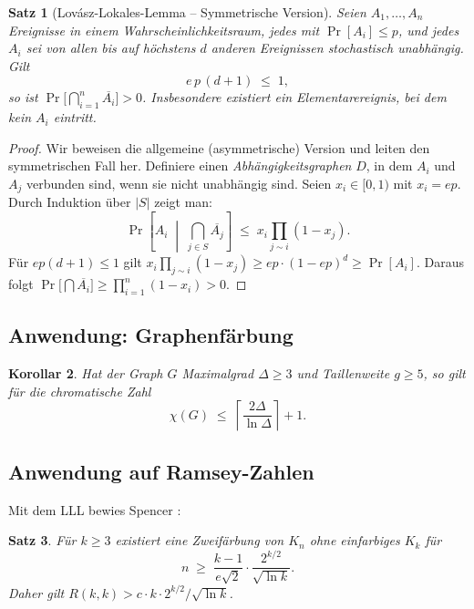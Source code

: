 \documentclass[12pt,a4paper]{amsart}
\newtheorem{theorem}{Satz}[section]
\newtheorem{corollary}[theorem]{Korollar}
\theoremstyle{definition}
\theoremstyle{remark}
\begin{document}
\begin{theorem}[Lov\'asz-Lokales-Lemma -- Symmetrische Version]\label{satz:lll}
Seien $A_1, \ldots, A_n$ Ereignisse in einem Wahrscheinlichkeitsraum, jedes mit
$\Pr[A_i] \le p$, und jedes $A_i$ sei von allen bis auf h\"ochstens $d$ anderen
Ereignissen stochastisch unabh\"angig.  Gilt
\[
  e\,p\,(d+1) \;\le\; 1,
\]
so ist $\Pr\bigl[\bigcap_{i=1}^n \overline{A_i}\bigr] > 0$.  Insbesondere
existiert ein Elementarereignis, bei dem kein $A_i$ eintritt.
\end{theorem}

\begin{proof}
Wir beweisen die allgemeine (asymmetrische) Version und leiten den symmetrischen
Fall her.  Definiere einen \emph{Abh\"angigkeitsgraphen} $D$, in dem $A_i$ und
$A_j$ verbunden sind, wenn sie nicht unabh\"angig sind.  Seien $x_i \in [0,1)$
mit $x_i = ep$.  Durch Induktion \"uber $|S|$ zeigt man:
\[
  \Pr\left[A_i \;\middle|\; \bigcap_{j \in S} \overline{A_j}\right]
  \;\le\; x_i \prod_{j \sim i} (1-x_j).
\]
F\"ur $ep(d+1) \le 1$ gilt $x_i \prod_{j\sim i}(1-x_j) \ge ep\cdot(1-ep)^d \ge \Pr[A_i]$.
Daraus folgt
$\Pr\bigl[\bigcap \overline{A_i}\bigr] \ge \prod_{i=1}^n (1-x_i) > 0$.
\end{proof}

\subsection{Anwendung: Graphenf\"arbung}

\begin{corollary}
Hat der Graph $G$ Maximalgrad $\Delta \ge 3$ und Taillenweite $g \ge 5$, so gilt
f\"ur die chromatische Zahl
\[
  \chi(G) \;\le\; \left\lceil \frac{2\Delta}{\ln \Delta} \right\rceil + 1.
\]
\end{corollary}

\subsection{Anwendung auf Ramsey-Zahlen}

Mit dem LLL bewies Spencer \cite{Spencer1975}:

\begin{theorem}
F\"ur $k \ge 3$ existiert eine Zweif\"arbung von $K_n$ ohne einfarbiges $K_k$
f\"ur
\[
  n \;\ge\; \frac{k-1}{e\sqrt{2}} \cdot \frac{2^{k/2}}{\sqrt{\ln k}}.
\]
Daher gilt $R(k,k) > c \cdot k \cdot 2^{k/2}/\sqrt{\ln k}$.
\end{theorem}
\end{document}
